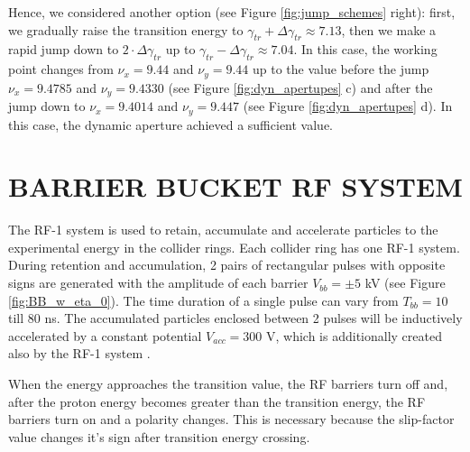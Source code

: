 \documentclass[a4paper]{jpconf}
\begin{document}
\par Hence, we considered another option (see Figure \ref{fig:jump_schemes} right): first, we gradually raise the transition energy to $\gamma_{tr}+\Delta\gamma_{tr}\approx7.13$, then we make a rapid jump down to $2\cdot\Delta\gamma_{tr}$ up to $\gamma_{tr}-\Delta\gamma_{tr}\approx7.04$. In this case, the working point changes from $\nu_{x}=9.44$ and $\nu_{y}=9.44$  up to the value before the jump $\nu_{x}=9.4785$ and $\nu_{y}=9.4330$ (see Figure \ref{fig:dyn_apertupes} c) and after the jump down to $\nu_{x}=9.4014$ and $\nu_{y}=9.447$ (see Figure \ref{fig:dyn_apertupes} d). In this case, the dynamic aperture achieved a sufficient value.

\section{BARRIER BUCKET RF SYSTEM}

\par The RF-1 system is used to retain, accumulate and accelerate particles to the experimental energy in the collider rings. Each collider ring has one RF-1 system. During retention and accumulation, 2 pairs of rectangular pulses with opposite signs are generated with the amplitude of each barrier $V_{bb}=\pm5$ kV (see Figure \ref{fig:BB_w_eta_0}). The time duration of a single pulse can vary from $T_{bb}=10$ till $80$ ns. The accumulated particles enclosed between 2 pulses will be inductively accelerated by a constant potential $V_{acc}=300$ V, which is additionally created also by the RF-1 system \cite{NICA}. 

\par When the energy approaches the transition value, the RF barriers turn off and, after the proton energy becomes greater than the transition energy, the RF barriers turn on and a polarity changes. This is necessary because the slip-factor value changes it’s sign after transition energy crossing.
\end{document}
